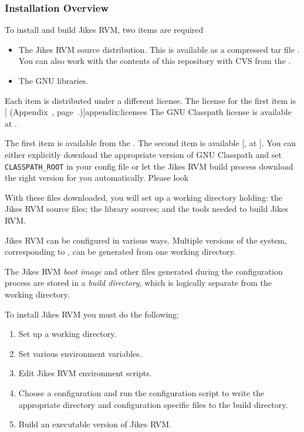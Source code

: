 \subsubsection{Installation Overview}\label{sec:installDetails}

To install and build Jikes\TMweb{} RVM, two items are required
\begin{itemize}
\item The Jikes RVM source distribution.  This is available as a
compressed tar file \texttt{\RVMTarFile}.  You can also work with the
contents of this repository with CVS from the 
.

\item The GNU 
 libraries. 
\end{itemize}

Each item is distributed under a different license.  The license for
the first item is [ (Appendix~\Ref, page~\Pageref.)]{appendix:licenses}
The GNU Classpath license is available at 
\xlink{\texttt{\classpathURL}}{\classpathURL}. 

The first item is available  from the . The second item is
available [, at \texttt{\classpathURL}]{\classpathURL}.
You can either explicitly download the appropriate version of GNU
Classpath and set \texttt{CLASSPATH\_ROOT} in your config file or let
the Jikes RVM build process download the right version for you
automatically.  Please look \AtManualClasspathRootDiscussion{}

With these files downloaded, you will set up 
a working directory holding: the Jikes RVM source files; the 
library sources; and the tools needed to build Jikes RVM. 

%
Jikes RVM can be configured in various ways.  Multiple versions of the system,
corresponding to , can be generated from 
one working directory.   

The Jikes RVM {\em boot image} and other files generated during the 
configuration process
are stored in a {\em build directory},
 which is logically separate from the working directory. 

To install Jikes RVM  you must do the following:
\begin{enumerate}
\item Set up a working directory.
\item Set various environment variables.
\item Edit Jikes RVM environment scripts.
\item Choose a configuration and run the configuration script to write
the appropriate directory and configuration specific files to the
build directory.
\item Build an executable version of Jikes RVM.
\end{enumerate}

